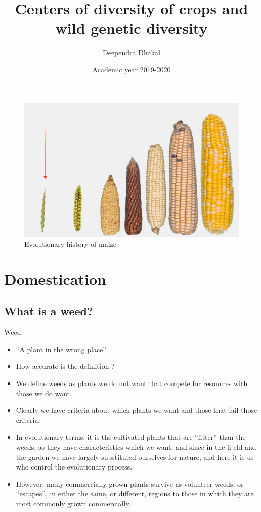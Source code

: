 \documentclass[ignorenonframetext,aspectratio=169]{beamer}
\title{Centers of diversity of crops and wild genetic diversity}
\author{Deependra Dhakal}
\institute{GAASC, Baitadi \and Tribhuwan University}
\date{Academic year 2019-2020}
\providecommand{\tightlist}{%
  \setlength{\itemsep}{0pt}\setlength{\parskip}{0pt}}
\begin{document}
\frame{\titlepage}

\begin{frame}
\tableofcontents[hideallsubsections]
\end{frame}
\begin{frame}

\begin{figure}

{\centering \includegraphics[width=0.55\linewidth]{./../images/maize_breeding} 

}

\caption{Evolutionary history of maize}\label{fig:maize-domestication}
\end{figure}

\end{frame}

\hypertarget{domestication}{%
\section{Domestication}\label{domestication}}

\hypertarget{what-is-a-weed}{%
\subsection{What is a weed?}\label{what-is-a-weed}}

\begin{frame}{Weed}
\protect\hypertarget{weed}{}

\begin{itemize}
\tightlist
\item
  ``A plant in the wrong place''
\item
  How accurate is the definition ?
\item
  We define weeds as plants we do not want that compete for resources
  with those we do want.
\item
  Clearly we have criteria about which plants we want and those that
  fail those criteria.
\item
  In evolutionary terms, it is the cultivated plants that are ``fitter''
  than the weeds, as they have characteristics which we want, and since
  in the fi eld and the garden we have largely substituted ourselves for
  nature, and here it is us who control the evolutionary process.
\item
  However, many commercially grown plants survive as volunteer weeds, or
  ``escapes'', in either the same, or different, regions to those in
  which they are most commonly grown commercially.
\end{itemize}

\end{frame}
\end{document}
